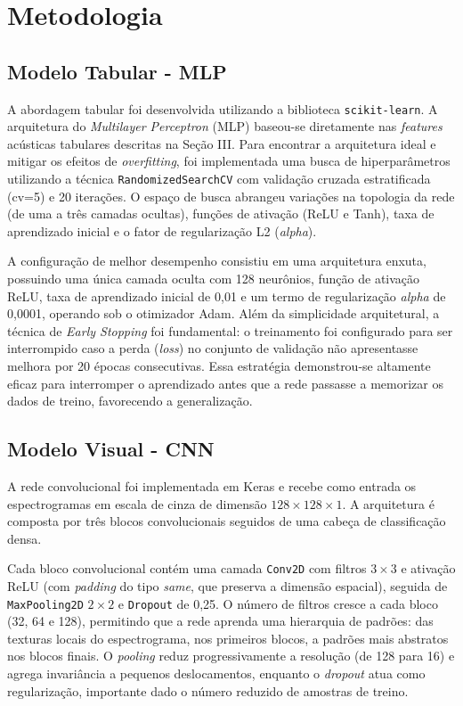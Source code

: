 \documentclass[conference]{IEEEtran}
\begin{document}
	
	\section{Metodologia}
	
	\subsection{Modelo Tabular - MLP}
	A abordagem tabular foi desenvolvida utilizando a biblioteca \texttt{scikit-learn}. A arquitetura do \textit{Multilayer Perceptron} (MLP) baseou-se diretamente nas \textit{features} acústicas tabulares descritas na Seção III. Para encontrar a arquitetura ideal e mitigar os efeitos de \textit{overfitting}, foi implementada uma busca de hiperparâmetros utilizando a técnica \texttt{RandomizedSearchCV} com validação cruzada estratificada (cv=5) e 20 iterações. O espaço de busca abrangeu variações na topologia da rede (de uma a três camadas ocultas), funções de ativação (ReLU e Tanh), taxa de aprendizado inicial e o fator de regularização L2 (\textit{alpha}).
	
	A configuração de melhor desempenho consistiu em uma arquitetura enxuta, possuindo uma única camada oculta com 128 neurônios, função de ativação ReLU, taxa de aprendizado inicial de 0,01 e um termo de regularização \textit{alpha} de 0,0001, operando sob o otimizador Adam. Além da simplicidade arquitetural, a técnica de \textit{Early Stopping} foi fundamental: o treinamento foi configurado para ser interrompido caso a perda (\textit{loss}) no conjunto de validação não apresentasse melhora por 20 épocas consecutivas. Essa estratégia demonstrou-se altamente eficaz para interromper o aprendizado antes que a rede passasse a memorizar os dados de treino, favorecendo a generalização.
	
	\subsection{Modelo Visual - CNN}
	A rede convolucional foi implementada em Keras e recebe como entrada os espectrogramas em escala de cinza de dimensão $128 \times 128 \times 1$. A arquitetura é composta por três blocos convolucionais seguidos de uma cabeça de classificação densa.
	
	Cada bloco convolucional contém uma camada \texttt{Conv2D} com filtros $3 \times 3$ e ativação ReLU (com \textit{padding} do tipo \textit{same}, que preserva a dimensão espacial), seguida de \texttt{MaxPooling2D} $2 \times 2$ e \texttt{Dropout} de 0,25. O número de filtros cresce a cada bloco (32, 64 e 128), permitindo que a rede aprenda uma hierarquia de padrões: das texturas locais do espectrograma, nos primeiros blocos, a padrões mais abstratos nos blocos finais. O \textit{pooling} reduz progressivamente a resolução (de 128 para 16) e agrega invariância a pequenos deslocamentos, enquanto o \textit{dropout} atua como regularização, importante dado o número reduzido de amostras de treino.
	
\end{document}
